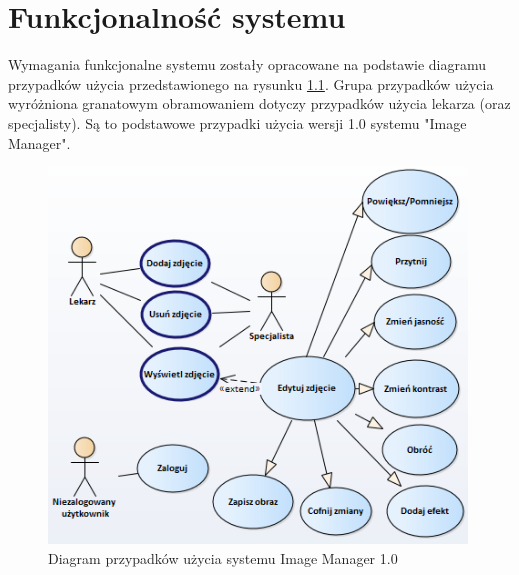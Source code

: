 \documentclass{scrreprt}
\begin{document}
\chapter{Funkcjonalno\'sć systemu}
Wymagania funkcjonalne systemu zostały opracowane na podstawie diagramu przypadków użycia przedstawionego na rysunku \ref{fig:uc1}. Grupa przypadków użycia wyróżniona granatowym obramowaniem dotyczy  przypadków użycia lekarza (oraz specjalisty). Są to podstawowe przypadki użycia wersji 1.0 systemu "Image Manager".
\begin{figure}[h]
    \centering
    \includegraphics[width=0.99\textwidth]{useCases.png}
    \caption{Diagram przypadków użycia systemu Image Manager 1.0}
    \label{fig:uc1}
\end{figure}
\end{document}
